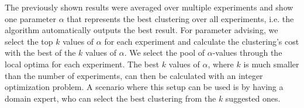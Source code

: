 The previously shown results were averaged over multiple experiments and show one parameter $\alpha$ that represents the best clustering over all experiments, i.e. the algorithm automatically outputs the best result. For parameter advising, we select the top $k$ values of $\alpha$ for each experiment and calculate the clustering's cost with the best of the $k$ values of $\alpha$. We select the pool of $\alpha$-values through the local optima for each experiment. The best $k$ values of $\alpha$, where $k$ is much smaller than the number of experiments, can then be calculated with an integer optimization problem. A scenario where this setup can be used is by having a domain expert, who can select the best clustering from the $k$ suggested ones.